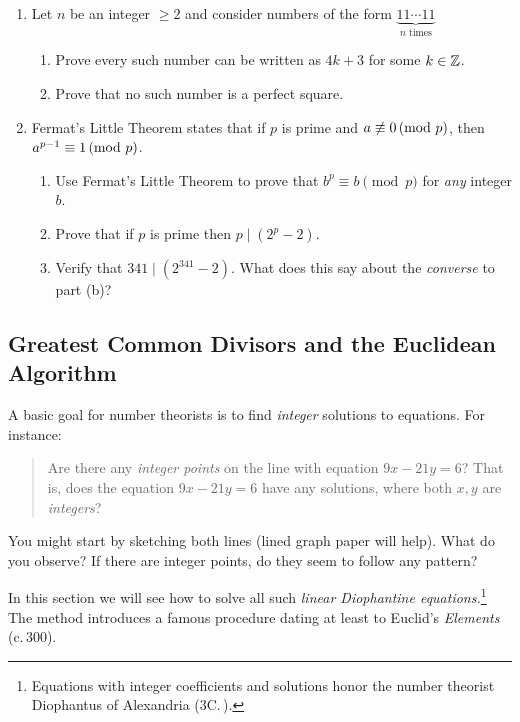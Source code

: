 \begin{exercises}{}{}
\begin{enumerate}
	    
	  \item Let $n$ be an integer $\ge 2$ and consider numbers of the form $\underbrace{11\cdots 11}_{n \text{ times}}$
	  \begin{enumerate}
	    \item Prove every such number can be written as $4k+3$ for some $k\in\mathbb{Z}$.
	    \item Prove that no such number is a perfect square.
	  \end{enumerate}
		
	    
	  \item Fermat's Little Theorem states that if $p$ is prime and $a\not\equiv 0\negthickspace\pmod{p}$, then $a^{p-1}\equiv 1\negthickspace\pmod{p}$.
		\begin{enumerate}
		  \item Use Fermat's Little Theorem to prove that $b^p\equiv b\pmod p$ for \emph{any} integer $b$.
		  \item Prove that if $p$ is prime then $p\mid(2^p-2)$.
		  \item Verify that $341\mid (2^{341}-2)$. What does this say about the \emph{converse} to part (b)?
		\end{enumerate}
	  
	\end{enumerate}

\end{exercises}

\clearpage


\subsection{Greatest Common Divisors and the Euclidean Algorithm}\label{sec:gcd}

A basic goal for number theorists is to find \emph{integer} solutions to equations. For instance:
\begin{quote}
	Are there any \emph{integer points} on the line with equation $9x-21y=6$? That is, does the equation $9x-21y=6$ have any solutions, where both $x,y$ are \emph{integers}?
\end{quote}

You might start by sketching both lines (lined graph paper will help). What do you observe? If there are integer points, do they seem to follow any pattern?\smallbreak

In this section we will see how to solve all such \emph{linear Diophantine equations.}\footnote{Equations with integer coefficients and solutions honor the number theorist Diophantus of Alexandria (3\rd{}C.\,\CE).} The method introduces a famous procedure dating at least to Euclid's \emph{Elements} (c.\,300\BCE).

